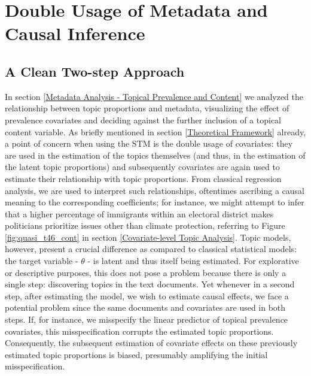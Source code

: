\section{Double Usage of Metadata and Causal Inference}
\label{Overfitting and Causal Inference - Alternative Modeling Strategies}

\subsection{A Clean Two-step Approach}
\label{Two-step Approach: CTM}

In section \ref{Metadata Analysis - Topical Prevalence and Content} we analyzed the relationship between topic proportions and metadata, visualizing the effect of prevalence covariates and deciding against the further inclusion of a topical content variable. As briefly mentioned in section \ref{Theoretical Framework} already, a point of concern when using the STM is the double usage of covariates: they are used in the estimation of the topics themselves (and thus, in the estimation of the latent topic proportions) and subsequently covariates are again used to estimate their relationship with topic proportions. From classical regression analysis, we are used to interpret such relationships, oftentimes ascribing a causal meaning to the corresponding coefficients; for instance, we might attempt to infer that a higher percentage of immigrants within an electoral district makes politicians prioritize issues other than climate protection, referring to Figure \ref{fig:quasi_t46_cont} in section \ref{Covariate-level Topic Analysis}. Topic models, however, present a crucial difference as compared to classical statistical models: the target variable - $\theta$ - is latent and thus itself being estimated. For explorative or descriptive purposes, this does not pose a problem because there is only a single step: discovering topics in the text documents. Yet whenever in a second step, after estimating the model, we wish to estimate causal effects, we face a potential problem since the same documents and covariates are used in both steps. If, for instance, we misspecify the linear predictor of topical prevalence covariates, this misspecification corrupts the estimated topic proportions. Consequently, the subsequent estimation of covariate effects on these previously estimated topic proportions is biased, presumably amplifying the initial misspecification.

